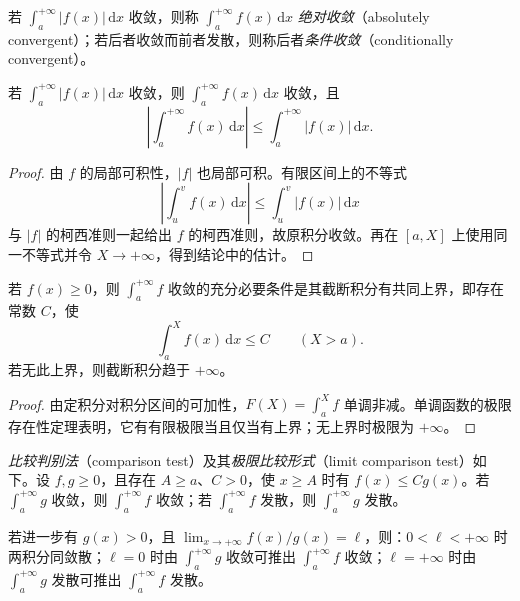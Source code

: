 \begin{definition}[绝对收敛与条件收敛]
\label{def:absolute-and-conditional-improper-integrals}
若 $\int_a^{+\infty}|f(x)|\,\mathrm{d}x$ 收敛，则称 $\int_a^{+\infty}f(x)\,\mathrm{d}x$ \emph{绝对收敛}（absolutely convergent）；若后者收敛而前者发散，则称后者\emph{条件收敛}（conditionally convergent）。
\end{definition}

\begin{theorem}[绝对收敛蕴含收敛]
\label{thm:absolute-improper-integrability-implies-convergence}
若 $\int_a^{+\infty}|f(x)|\,\mathrm{d}x$ 收敛，则 $\int_a^{+\infty}f(x)\,\mathrm{d}x$ 收敛，且
\[
    \left|\int_a^{+\infty}f(x)\,\mathrm{d}x\right|
    \leq\int_a^{+\infty}|f(x)|\,\mathrm{d}x.
\]
\end{theorem}

\begin{proof}
由 $f$ 的局部可积性，$|f|$ 也局部可积。有限区间上的不等式
\[
    \left|\int_u^v f(x)\,\mathrm{d}x\right|
    \leq\int_u^v|f(x)|\,\mathrm{d}x
\]
与 $|f|$ 的柯西准则一起给出 $f$ 的柯西准则，故原积分收敛。再在 $[a,X]$ 上使用同一不等式并令 $X\to+\infty$，得到结论中的估计。
\end{proof}

\begin{theorem}[非负函数积分的有界判据]
\label{thm:nonnegative-improper-integral-boundedness}
若 $f(x)\geq0$，则 $\int_a^{+\infty}f$ 收敛的充分必要条件是其截断积分有共同上界，即存在常数 $C$，使
\[
    \int_a^X f(x)\,\mathrm{d}x\leq C\qquad(X>a).
\]
若无此上界，则截断积分趋于 $+\infty$。
\end{theorem}

\begin{proof}
由定积分对积分区间的可加性，$F(X)=\int_a^X f$ 单调非减。单调函数的极限存在性定理表明，它有有限极限当且仅当有上界；无上界时极限为 $+\infty$。
\end{proof}

\begin{theorem}[比较判别法及其极限形式]
\label{thm:comparison-tests-improper-integrals}
\emph{比较判别法}（comparison test）及其\emph{极限比较形式}（limit comparison test）如下。设 $f,g\geq0$，且存在 $A\geq a$、$C>0$，使 $x\geq A$ 时有 $f(x)\leq Cg(x)$。若 $\int_a^{+\infty}g$ 收敛，则 $\int_a^{+\infty}f$ 收敛；若 $\int_a^{+\infty}f$ 发散，则 $\int_a^{+\infty}g$ 发散。

若进一步有 $g(x)>0$，且 $\lim_{x\to+\infty}f(x)/g(x)=\ell$，则：$0<\ell<+\infty$ 时两积分同敛散；$\ell=0$ 时由 $\int_a^{+\infty}g$ 收敛可推出 $\int_a^{+\infty}f$ 收敛；$\ell=+\infty$ 时由 $\int_a^{+\infty}g$ 发散可推出 $\int_a^{+\infty}f$ 发散。
\end{theorem}

